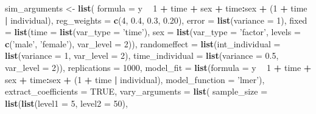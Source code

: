 \documentclass[man,mask,floatsintext]{apa6}
\newenvironment{Shaded}{\begin{snugshade}}{\end{snugshade}}
\newcommand{\DataTypeTok}[1]{\textcolor[rgb]{0.13,0.29,0.53}{#1}}
\newcommand{\DecValTok}[1]{\textcolor[rgb]{0.00,0.00,0.81}{#1}}
\newcommand{\FloatTok}[1]{\textcolor[rgb]{0.00,0.00,0.81}{#1}}
\newcommand{\KeywordTok}[1]{\textcolor[rgb]{0.13,0.29,0.53}{\textbf{#1}}}
\newcommand{\NormalTok}[1]{#1}
\newcommand{\OperatorTok}[1]{\textcolor[rgb]{0.81,0.36,0.00}{\textbf{#1}}}
\newcommand{\OtherTok}[1]{\textcolor[rgb]{0.56,0.35,0.01}{#1}}
\newcommand{\StringTok}[1]{\textcolor[rgb]{0.31,0.60,0.02}{#1}}
\begin{document}
\begin{Shaded}
\begin{Highlighting}[]
\NormalTok{sim_arguments <-}\StringTok{ }\KeywordTok{list}\NormalTok{(}
  \DataTypeTok{formula =}\NormalTok{ y }\OperatorTok{~}\StringTok{ }\DecValTok{1} \OperatorTok{+}\StringTok{ }\NormalTok{time }\OperatorTok{+}\StringTok{ }\NormalTok{sex }\OperatorTok{+}\StringTok{ }\NormalTok{time}\OperatorTok{:}\NormalTok{sex }\OperatorTok{+}\StringTok{ }\NormalTok{(}\DecValTok{1} \OperatorTok{+}\StringTok{ }\NormalTok{time }\OperatorTok{|}\StringTok{ }\NormalTok{individual),}
  \DataTypeTok{reg_weights =} \KeywordTok{c}\NormalTok{(}\DecValTok{4}\NormalTok{, }\FloatTok{0.4}\NormalTok{, }\FloatTok{0.3}\NormalTok{, }\FloatTok{0.20}\NormalTok{),}
  \DataTypeTok{error =} \KeywordTok{list}\NormalTok{(}\DataTypeTok{variance =} \DecValTok{1}\NormalTok{),}
  \DataTypeTok{fixed =} \KeywordTok{list}\NormalTok{(}\DataTypeTok{time =} \KeywordTok{list}\NormalTok{(}\DataTypeTok{var_type =} \StringTok{'time'}\NormalTok{),}
               \DataTypeTok{sex =} \KeywordTok{list}\NormalTok{(}\DataTypeTok{var_type =} \StringTok{'factor'}\NormalTok{, }\DataTypeTok{levels =} \KeywordTok{c}\NormalTok{(}\StringTok{'male'}\NormalTok{, }\StringTok{'female'}\NormalTok{),}
                          \DataTypeTok{var_level =} \DecValTok{2}\NormalTok{)),}
  \DataTypeTok{randomeffect =} \KeywordTok{list}\NormalTok{(}\DataTypeTok{int_individual =} \KeywordTok{list}\NormalTok{(}\DataTypeTok{variance =} \DecValTok{1}\NormalTok{, }\DataTypeTok{var_level =} \DecValTok{2}\NormalTok{),}
                      \DataTypeTok{time_individual =} \KeywordTok{list}\NormalTok{(}\DataTypeTok{variance =} \FloatTok{0.5}\NormalTok{, }\DataTypeTok{var_level =} \DecValTok{2}\NormalTok{)),}
  \DataTypeTok{replications =} \DecValTok{1000}\NormalTok{,}
  \DataTypeTok{model_fit =} \KeywordTok{list}\NormalTok{(}\DataTypeTok{formula =}\NormalTok{ y }\OperatorTok{~}\StringTok{ }\DecValTok{1} \OperatorTok{+}\StringTok{ }\NormalTok{time }\OperatorTok{+}\StringTok{ }\NormalTok{sex }\OperatorTok{+}\StringTok{ }\NormalTok{time}\OperatorTok{:}\NormalTok{sex }\OperatorTok{+}\StringTok{ }
\StringTok{                     }\NormalTok{(}\DecValTok{1} \OperatorTok{+}\StringTok{ }\NormalTok{time }\OperatorTok{|}\StringTok{ }\NormalTok{individual), }
                   \DataTypeTok{model_function =} \StringTok{'lmer'}\NormalTok{),}
  \DataTypeTok{extract_coefficients =} \OtherTok{TRUE}\NormalTok{,}
  \DataTypeTok{vary_arguments =} \KeywordTok{list}\NormalTok{(}
    \DataTypeTok{sample_size =} \KeywordTok{list}\NormalTok{(}\KeywordTok{list}\NormalTok{(}\DataTypeTok{level1 =} \DecValTok{5}\NormalTok{, }\DataTypeTok{level2 =} \DecValTok{50}\NormalTok{),}

\end{Highlighting}
\end{Shaded}
\end{document}
